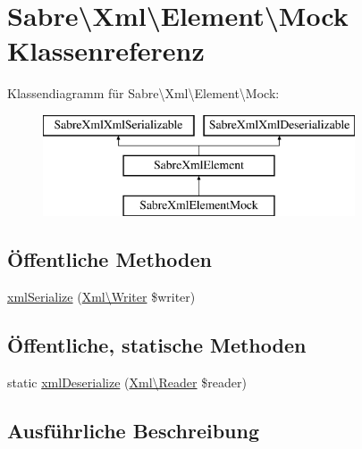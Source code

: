 \hypertarget{class_sabre_1_1_xml_1_1_element_1_1_mock}{}\section{Sabre\textbackslash{}Xml\textbackslash{}Element\textbackslash{}Mock Klassenreferenz}
\label{class_sabre_1_1_xml_1_1_element_1_1_mock}
Klassendiagramm für Sabre\textbackslash{}Xml\textbackslash{}Element\textbackslash{}Mock\+:\begin{figure}[H]
\begin{center}
\leavevmode
\includegraphics[height=3.000000cm]{class_sabre_1_1_xml_1_1_element_1_1_mock}
\end{center}
\end{figure}
\subsection*{Öffentliche Methoden}
\begin{DoxyCompactItemize}
\item 
\mbox{\hyperlink{class_sabre_1_1_xml_1_1_element_1_1_mock_aebc0b0e45033272c7a9f76f21973ef1e}{xml\+Serialize}} (\mbox{\hyperlink{class_sabre_1_1_xml_1_1_writer}{Xml\textbackslash{}\+Writer}} \$writer)
\end{DoxyCompactItemize}
\subsection*{Öffentliche, statische Methoden}
\begin{DoxyCompactItemize}
\item 
static \mbox{\hyperlink{class_sabre_1_1_xml_1_1_element_1_1_mock_ae0a1963d550eb38ce5b09f7adee9e9e6}{xml\+Deserialize}} (\mbox{\hyperlink{class_sabre_1_1_xml_1_1_reader}{Xml\textbackslash{}\+Reader}} \$reader)
\end{DoxyCompactItemize}


\subsection{Ausführliche Beschreibung}


